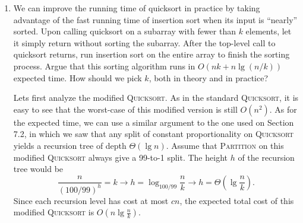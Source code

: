 \documentclass{report}
\makeatletter
\renewenvironment{framed}{%
 \def\FrameCommand##1{\hskip\@totalleftmargin
 \fboxsep=\FrameSep\fbox{##1}}%
 \MakeFramed {\advance\hsize-\width
   \@totalleftmargin\z@ \linewidth\hsize
   \@setminipage}}%
 {\par\unskip\endMakeFramed}
\DeclarePairedDelimiter{\floor}{\lfloor}{\rfloor}
\makeatother
\begin{document}
\begin{enumerate}
\begin{framed}
Combining equations $(7.2)$ and $(7.3)$, we get
\begin{equation*}
\begin{aligned}
  \text{E}[X] &=   \sum_{i = 1}^{n - 1} \sum_{j = i + 1}^{n} \frac{2}{j - i + 1}\\
              &=   \sum_{i = 1}^{\floor{n/2}} \sum_{k = 1}^{n - i} \frac{2}{k + 1} +
                   \sum_{i = \floor{n/2} + 1}^{n - 1} \sum_{k = 1}^{n - i} \frac{2}{k + 1}\\
              &\ge \sum_{i = 1}^{\floor{n/2}} \sum_{k = 1}^{n - i} \frac{2}{k + 1}\\
              &\ge \sum_{i = 1}^{\floor{n/2}} \sum_{k = 1}^{n/2} \frac{2}{k + 1}\\
              &\ge \sum_{i = 1}^{\floor{n/2}} \sum_{k = 1}^{n/2} \frac{1}{k} & \text{(since $k \ge 1$)}\\
              &= \Bigl\lfloor \frac{n}{2} \Bigr\rfloor \cdot \left(\lg \left( \frac{n}{2} \right) + O(1) \right) & \text{(approx. of harmonic number)}\\
              &= \Omega(n \lg n).
\end{aligned}
\end{equation*}
\end{framed}

\item[7.4{-}5]{We can improve the running time of quicksort in practice by
taking advantage of the fast running time of insertion sort when its input is
``nearly'' sorted. Upon calling quicksort on a subarray with fewer than
$k$ elements, let it simply return without sorting the subarray. After the
top-level call to quicksort returns, run insertion sort on the entire array
to finish the sorting process. Argue that this sorting algorithm runs in
$O(nk + n \lg(n/k))$ expected time. How should we pick $k$, both in theory and
in practice?}

\begin{framed}
Lets first analyze the modified \textsc{Quicksort}. As in the standard
\textsc{Quicksort}, it is easy to see that the worst-case of this modified
version is still $O(n^2)$. As for the expected time, we can use a similar
argument to the one used on Section 7.2, in which we saw that any split of
constant proportionality on \textsc{Quicksort} yields a recursion tree of
depth $\Theta(\lg n)$. Assume that \textsc{Partition} on this modified
\textsc{Quicksort} always give a 99-to-1 split. The height $h$ of the recursion
tree would be
\[
  \frac{n}{(100/99)^h} = k \rightarrow h = \log_{100/99} \frac{n}{k} \rightarrow h = \Theta\left(\lg \frac{n}{k}\right).
\]
Since each recursion level has cost at most $cn$, the expected total cost of
this modified \textsc{Quicksort} is $O(n \lg \frac{n}{k})$.


\end{framed}
\end{enumerate}
\end{document}
